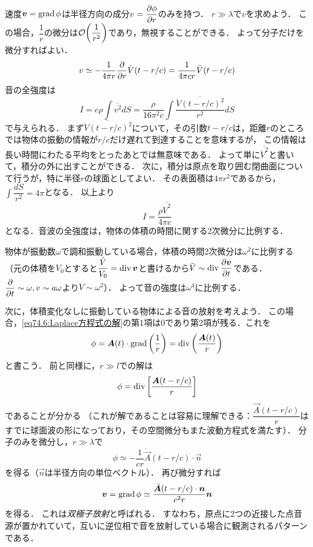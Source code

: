 速度$\vb*{v} = \operatorname{grad} \phi$は半径方向の成分$v = \dpdv{\phi}{r}$のみを持つ．
$r \gg \lambda$で$v$を求めよう．
この場合，$\dfrac{1}{r}$の微分は$\order{\dfrac{1}{r^2}}$であり，無視することができる．
よって分子だけを微分すればよい．
\begin{equation}
    v \simeq - \frac{1}{4\pi r} \pdv{r}\dot{V}(t-r/c) = \frac{1}{4\pi cr} \ddot{V}(t-r/c)
\end{equation}
音の全強度は
\[
    I = c\rho \int \overline{v^2} dS = \frac{\rho}{16\pi^2c} \int \frac{\overline{\ddot{V}(t-r/c)^2}}{r^2} dS
\]
で与えられる．
まず$\overline{\ddot{V}(t-r/c)^2}$について，その引数$t-r/c$は，距離$r$のところでは物体の振動の情報が$r/c$だけ遅れて到達することを意味するが，
この情報は長い時間にわたる平均をとったあとでは無意味である．
よって単に$\overline{\ddot{V}^2}$と書いて，積分の外に出すことができる．
次に，積分は原点を取り囲む閉曲面について行うが，特に半径$r$の球面としてよい．
その表面積は$4\pi r^2$であるから，$\displaystyle\int \dfrac{dS}{r^2} = 4\pi$となる．
以上より
\begin{equation}
    I = \frac{\rho \overline{\ddot{V}^2}}{4\pi c}
\end{equation}
となる．音波の全強度は，物体の体積の時間に関する2次微分に比例する．

物体が振動数$\omega$で調和振動している場合，体積の時間2次微分は$\omega^2$に比例する
（元の体積を$V_0$とすると$\dfrac{\dot{V}}{V_0}=\operatorname{div}\vb*{v}$と書けるから$\ddot{V}\sim\Div\dpdv{\v}{t}$である．
$\dpdv{t}\sim\omega, v\sim a\omega$より$\ddot{V}\sim\omega^2$）．
よって音の強度は$\omega^4$に比例する．





次に，体積変化なしに振動している物体による音の放射を考えよう．
この場合，\eqref{eq74.6:Laplace方程式の解}の第1項は0であり第2項が残る．これを
\[
    \phi = \vb*{A}(t)\cdot\operatorname{grad}\left( \frac{1}{r} \right) = \operatorname{div} \left( \frac{\vb*{A}(t)}{r} \right)
\]
と書こう．
前と同様に，$r \gg l$での解は
\[
    \phi = \operatorname{div}\left[ \frac{\vb*{A}(t-r/c)}{r} \right]
\]
であることが分かる
（これが解であることは容易に理解できる：$\dfrac{\vec{A}(t-r/c)}{r}$はすでに球面波の形になっており，その空間微分もまた波動方程式を満たす）．
分子のみを微分し，$r \gg \lambda$で
\begin{equation}
    \phi \simeq - \frac{1}{cr} \dot{\vec{A}}(t-r/c) \cdot \vec{n}
\end{equation}
を得る（$\vec{n}$は半径方向の単位ベクトル）．
再び微分すれば
\begin{equation}
    \vb*{v} = \operatorname{grad} \phi \simeq \frac{\ddot{\vb*{A}}(t-r/c)\cdot\vb*{n}}{c^2r} \vb*{n}
\end{equation}
を得る．
これは\emph{双極子放射}と呼ばれる．
すなわち，原点に2つの近接した点音源が置かれていて，互いに逆位相で音を放射している場合に観測されるパターンである．



